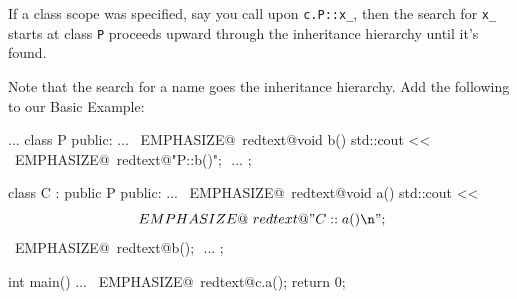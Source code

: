 If a class scope was specified, say you call upon \verb!c.P::x_!, then
the search for \verb!x_! starts at class \verb!P! proceeds upward
through the inheritance hierarchy until it's found.

Note that the search for a name goes  the inheritance
hierarchy. Add the following to our Basic Example:
\begin{console}[commandchars=\~\@\$]
...
class P
{
public:
        ...
        ~EMPHASIZE@~redtext@void b() { std::cout <<$$ 
                   ~EMPHASIZE@~redtext@"P::b()\n"; }$$
        ...
};

class C : public P
{
public:
        ...
        ~EMPHASIZE@~redtext@void a() { std::cout <<$$ 
                   ~EMPHASIZE@~redtext@"C::a()\n";$$
                   ~EMPHASIZE@~redtext@b();  }$$
        ...
};

int main()
{   
    ...
    ~EMPHASIZE@~redtext@c.a();$$
    return 0;
}
\end{console}


